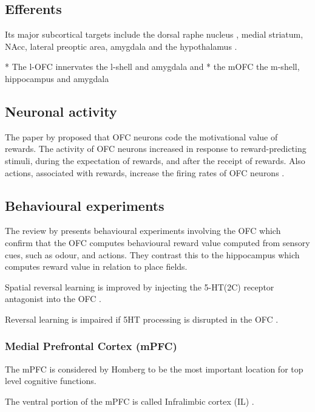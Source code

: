 \documentclass[12pt,a4paper]{article}
\begin{document}
\subsection{Efferents}

Its major subcortical targets include the dorsal raphe nucleus \citep{Luo2015}, medial striatum, NAcc, lateral preoptic area, amygdala and the hypothalamus \citep{Vertes2012}.

  * The l-OFC innervates the l-shell and amygdala and 
  * the mOFC the m-shell, hippocampus and amygdala \citep{Brog1993} \citep{Noonan2012}

\subsection{Neuronal activity}

The paper by \citep{Tremblay1999} proposed that OFC neurons code the motivational value of rewards. The activity of OFC neurons increased in response to reward-predicting stimuli, during the expectation of rewards, and after the receipt of rewards. Also actions, associated with rewards, increase the firing rates of OFC neurons \citep{Wikenheiser2016}.

\subsection{Behavioural experiments}

The review by \citep{Wikenheiser2016} presents behavioural experiments involving the OFC which confirm that the OFC computes behavioural reward value computed from sensory cues, such as odour, and actions. They contrast this to the hippocampus which computes reward value in relation to place fields.

Spatial reversal learning is improved by injecting the 5-HT(2C) receptor antagonist into the OFC \citep{Boulougouris2010}. 

Reversal learning is impaired if 5HT processing is disrupted in the OFC \citep{Bari2013}.

\subsubsection{Medial Prefrontal Cortex (mPFC)}

The mPFC is considered by Homberg to be the most important location for top level cognitive
functions. 

The ventral portion of the mPFC is called Infralimbic cortex (IL) \citep{Tsutsui-Kimura2016}.
\end{document}
